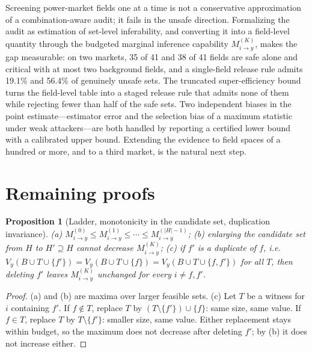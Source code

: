 \documentclass[preprint,12pt]{elsarticle}
\newtheorem{proposition}{Proposition}
\newcommand{\Vy}{V_{y}}
\newcommand{\Mik}{M^{(K)}_{i \to y}}
\begin{document}
Screening power-market fields one at a time is not a conservative approximation of a
combination-aware audit; it fails in the unsafe direction. Formalizing the audit as
estimation of set-level inferability, and converting it into a field-level quantity through
the budgeted marginal inference capability $\Mik$, makes the gap measurable: on two markets,
35 of 41 and 38 of 41 fields are safe alone and critical with at most two background fields,
and a single-field release rule admits 19.1\% and 56.4\% of genuinely unsafe sets. The
truncated super-efficiency bound turns the field-level table into a staged release rule that
admits none of them while rejecting fewer than half of the safe sets. Two independent biases
in the point estimate---estimator error and the selection bias of a maximum statistic under
weak attackers---are both handled by reporting a certified lower bound with a calibrated
upper bound. Extending the evidence to field spaces of a hundred or more, and to a third
market, is the natural next step.

\appendix
\section{Remaining proofs}\label{app:proofs}

\begin{proposition}[Ladder, monotonicity in the candidate set, duplication invariance]
\label{prop:ladder}
\emph{(a)} $M^{(0)}_{i\to y}\le M^{(1)}_{i\to y}\le\cdots\le M^{(|H|-1)}_{i\to y}$;
\emph{(b)} enlarging the candidate set from $H$ to $H'\supseteq H$ cannot decrease
$\Mik$; \emph{(c)} if $f'$ is a duplicate of $f$, i.e.\ $\Vy(B\cup T\cup\{f'\}) =
\Vy(B\cup T\cup\{f\}) = \Vy(B\cup T\cup\{f,f'\})$ for all $T$, then deleting $f'$ leaves
$\Mik$ unchanged for every $i \ne f,f'$.
\end{proposition}
\begin{proof}
(a) and (b) are maxima over larger feasible sets. (c) Let $T$ be a witness for $i$
containing $f'$. If $f\notin T$, replace $T$ by $(T\setminus\{f'\})\cup\{f\}$: same size,
same value. If $f\in T$, replace $T$ by $T\setminus\{f'\}$: smaller size, same value. Either
replacement stays within budget, so the maximum does not decrease after deleting $f'$; by (b)
it does not increase either.
\end{proof}
\end{document}
